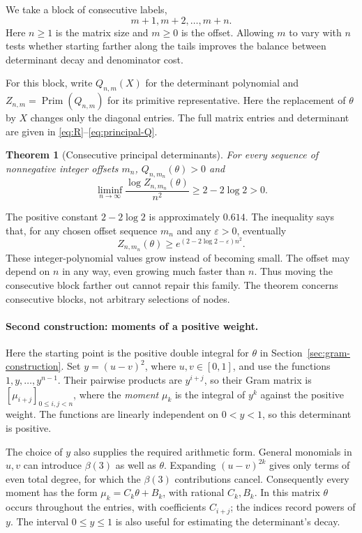 \documentclass[11pt]{article}
\newtheorem{theorem}{Theorem}[section]
\theoremstyle{definition}
\theoremstyle{remark}
\numberwithin{equation}{section}
\newcommand{\PP}{\operatorname{Prim}}
\begin{document}
We take a block of consecutive labels,
\[
 m+1,m+2,\ldots,m+n.
\]
Here $n\geq1$ is the matrix size and $m\geq0$ is the offset.
Allowing $m$ to vary with $n$ tests whether starting farther along
the tails improves the balance between determinant decay and
denominator cost.

For this block, write $Q_{n,m}(X)$ for the determinant polynomial
and $Z_{n,m}=\PP(Q_{n,m})$ for its primitive representative. Here the
replacement of $\theta$ by $X$ changes only the diagonal entries.
The full matrix entries and determinant are given in
\eqref{eq:R}--\eqref{eq:principal-Q}.

\begin{theorem}[Consecutive principal determinants]\label{thm:principal}
For every sequence of nonnegative integer offsets $m_n$,
$Q_{n,m_n}(\theta)>0$ and
\begin{equation}\label{eq:principal-result}
 \liminf_{n\to\infty}\frac{\log Z_{n,m_n}(\theta)}{n^2}
 \geq 2-2\log 2>0.
\end{equation}
\end{theorem}

The positive constant $2-2\log2$ is approximately $0.614$.
The inequality says that, for any chosen offset sequence $m_n$ and
any $\varepsilon>0$, eventually
\[
 Z_{n,m_n}(\theta)\geq
       e^{(2-2\log2-\varepsilon)n^2}.
\]
These integer-polynomial values grow instead of becoming small.
The offset may depend on $n$ in any way, even growing much faster
than $n$. Thus moving the consecutive block farther out cannot repair
this family. The theorem concerns consecutive blocks, not arbitrary
selections of nodes.

\paragraph{Second construction: moments of a positive weight.}
Here the starting point is the positive double integral for $\theta$
in Section~\ref{sec:gram-construction}. Set $y=(u-v)^2$, where
$u,v\in[0,1]$, and use the functions $1,y,\ldots,y^{n-1}$.
Their pairwise products are $y^{i+j}$, so their Gram matrix is
$[\mu_{i+j}]_{0\leq i,j<n}$, where the \emph{moment} $\mu_k$ is the
integral of $y^k$ against the positive weight. The functions are
linearly independent on $0<y<1$, so this determinant is positive.

The choice of $y$ also supplies the required arithmetic form.
General monomials in $u,v$ can introduce $\beta(3)$ as well as
$\theta$. Expanding $(u-v)^{2k}$ gives only terms of even total
degree, for which the $\beta(3)$ contributions cancel. Consequently
every moment has the form $\mu_k=C_k\theta+B_k$, with rational
$C_k,B_k$. In this matrix $\theta$ occurs throughout the entries,
with coefficients $C_{i+j}$; the indices record powers of $y$.
The interval $0\leq y\leq1$ is also useful for estimating the
determinant's decay.
\end{document}
